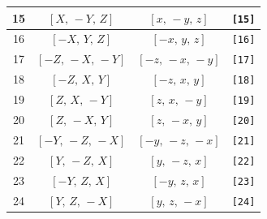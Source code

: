 \documentclass[fleqn,8pt]{jsarticle}
\begin{document}
\begin{longtable}{cccc}
15 & $\left[ X,\, - Y,\, Z \right]$ & $\left[ x,\, - y,\, z \right]$ & {\tt [15]} \\ \hline
16 & $\left[ - X,\, Y,\, Z \right]$ & $\left[ - x,\, y,\, z \right]$ & {\tt [16]} \\ \hline
17 & $\left[ - Z,\, - X,\, - Y \right]$ & $\left[ - z,\, - x,\, - y \right]$ & {\tt [17]} \\ \hline
18 & $\left[ - Z,\, X,\, Y \right]$ & $\left[ - z,\, x,\, y \right]$ & {\tt [18]} \\ \hline
19 & $\left[ Z,\, X,\, - Y \right]$ & $\left[ z,\, x,\, - y \right]$ & {\tt [19]} \\ \hline
20 & $\left[ Z,\, - X,\, Y \right]$ & $\left[ z,\, - x,\, y \right]$ & {\tt [20]} \\ \hline
21 & $\left[ - Y,\, - Z,\, - X \right]$ & $\left[ - y,\, - z,\, - x \right]$ & {\tt [21]} \\ \hline
22 & $\left[ Y,\, - Z,\, X \right]$ & $\left[ y,\, - z,\, x \right]$ & {\tt [22]} \\ \hline
23 & $\left[ - Y,\, Z,\, X \right]$ & $\left[ - y,\, z,\, x \right]$ & {\tt [23]} \\ \hline
24 & $\left[ Y,\, Z,\, - X \right]$ & $\left[ y,\, z,\, - x \right]$ & {\tt [24]} \\
\end{longtable}
\end{document}
